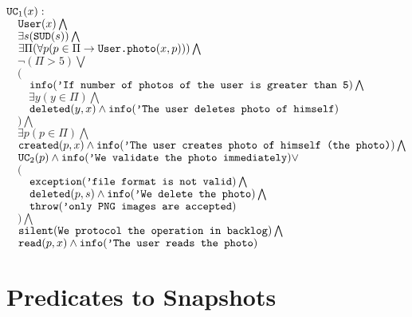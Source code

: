 \documentclass{article}
\begin{document}
        \begin{maths}
        $\mbox{\texttt{UC}}_1(x) : $ \\
        $\quad \mbox{\texttt{User}}(x) \bigwedge$ \\
        $\quad \exists s (\mbox{\texttt{SUD}}(s)) \bigwedge$ \\
        $\quad \exists \Pi(\forall p (p \in \Pi \to \mbox{\texttt{User.photo}}(x, p))) \bigwedge$ \\
        $\quad \neg (\Pi > 5) \bigvee $ \\
        $\quad ($ \\
        $\quad\quad \mbox{\texttt{info}}(\mbox{\texttt{'If number of photos of the user is greater than 5}})\bigwedge$ \\
        $\quad\quad \exists y(y \in \Pi) \bigwedge$ \\
        $\quad\quad \mbox{\texttt{deleted}}(y, x) \wedge \mbox{\texttt{info}}(\mbox{\texttt{'The user deletes photo of himself}})$ \\
        $\quad ) \bigwedge$ \\
        $\quad \exists p(p \in \Pi) \bigwedge$ \\
        $\quad \mbox{\texttt{created}}(p, x) \wedge \mbox{\texttt{info}}(\mbox{\texttt{'The user creates photo of himself (the photo)}})\bigwedge$ \\
        $\quad \mbox{\texttt{UC}}_2(p) \wedge \mbox{\texttt{info}}(\mbox{\texttt{'We validate the photo immediately}}) \vee$ \\
        $\quad ($ \\
        $\quad\quad \mbox{\texttt{exception}}(\mbox{\texttt{'file format is not valid}}) \bigwedge$ \\
        $\quad\quad \mbox{\texttt{deleted}}(p, s) \wedge \mbox{\texttt{info}}(\mbox{\texttt{'We delete the photo}})\bigwedge$ \\
        $\quad\quad \mbox{\texttt{throw}}(\mbox{\texttt{'only PNG images are accepted}})$ \\
        $\quad ) \bigwedge$ \\
        $\quad \mbox{\texttt{silent}}(\mbox{\texttt{We protocol the operation in backlog}})\bigwedge$ \\
        $\quad \mbox{\texttt{read}}(p, x)\wedge \mbox{\texttt{info}}(\mbox{\texttt{'The user reads the photo}})$ \\
        \end{maths}





\section{Predicates to Snapshots}
\label{sec:to-data}
\end{document}
